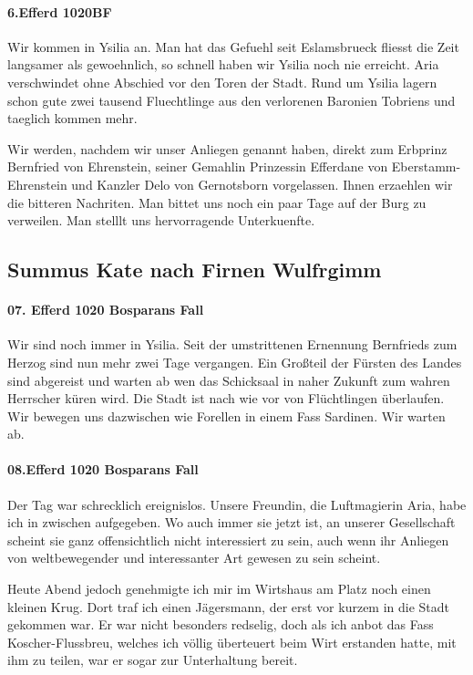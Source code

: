 \paragraph{6.Efferd 1020BF}
Wir kommen in Ysilia an. Man hat das Gefuehl seit Eslamsbrueck fliesst die Zeit langsamer als gewoehnlich, so schnell haben wir Ysilia noch nie erreicht. Aria verschwindet ohne Abschied vor den Toren der Stadt. Rund um Ysilia lagern schon gute zwei tausend Fluechtlinge aus den verlorenen Baronien Tobriens und taeglich kommen mehr.

Wir werden, nachdem wir unser Anliegen genannt haben, direkt zum Erbprinz Bernfried von Ehrenstein, seiner Gemahlin Prinzessin Efferdane von Eberstamm-Ehrenstein und Kanzler Delo von Gernotsborn vorgelassen. Ihnen erzaehlen wir die bitteren Nachriten. Man bittet uns noch ein paar Tage auf der Burg zu verweilen. Man stelllt uns hervorragende Unterkuenfte.

\subsection{Summus Kate nach Firnen Wulfrgimm}

\paragraph{07. Efferd 1020 Bosparans Fall}
Wir sind noch immer in Ysilia. Seit der umstrittenen Ernennung Bernfrieds zum Herzog sind nun mehr zwei Tage vergangen. Ein Großteil der Fürsten des Landes sind abgereist und warten ab wen das Schicksaal in naher Zukunft zum wahren Herrscher küren wird. Die Stadt ist nach wie vor von Flüchtlingen überlaufen. Wir bewegen uns dazwischen wie Forellen in einem Fass Sardinen. Wir warten ab.

\paragraph{08.Efferd 1020 Bosparans Fall}
Der Tag war schrecklich ereignislos. Unsere Freundin, die Luftmagierin Aria, habe ich in zwischen aufgegeben. Wo auch immer sie jetzt ist, an unserer Gesellschaft scheint sie ganz offensichtlich nicht interessiert zu sein, auch wenn ihr Anliegen von weltbewegender und interessanter Art gewesen zu sein scheint.

Heute Abend jedoch genehmigte ich mir im Wirtshaus am Platz noch einen kleinen Krug. Dort traf ich einen Jägersmann, der erst vor kurzem in die Stadt gekommen war. Er war nicht besonders redselig, doch als ich anbot das Fass Koscher-Flussbreu, welches ich völlig überteuert beim Wirt erstanden hatte, mit ihm zu teilen, war er sogar zur Unterhaltung bereit.

